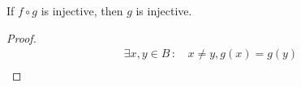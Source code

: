 \begin{question}

	If $f\circ g$ is injective, then $g$ is injective.



	\begin{proof}


		\begin{align*}
			\exists x,y \in B \,: & \, x \neq y, g(x) = g(y) \\
		\end{align*}


	\end{proof}

\end{question}
